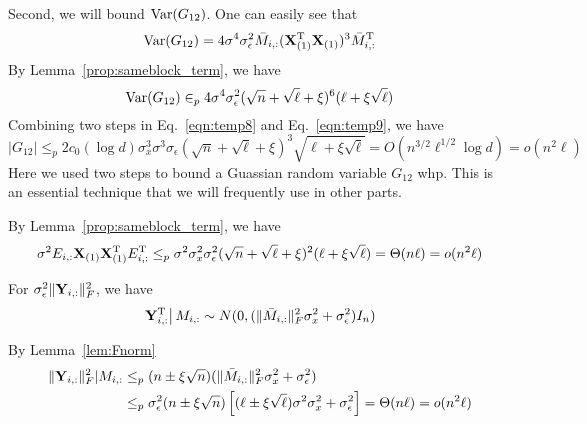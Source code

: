 Second, we will bound $\mathrm{Var}(G_{12})$. One can easily see that
\begin{equation}
    \mathrm{Var}(G_{12}) = 4\sigma^4 \sigma^2_{\epsilon} \bar M_{i, :}(\mathbf{X}_{(1)}^{\mathrm{T}}\mathbf{X}_{(1)})^3\bar M^{\mathrm{T}}_{i, :}
\end{equation}
By Lemma~\ref{prop:sameblock_term}, we have
\begin{equation} \label{eqn:temp9}
    \mathrm{Var}(G_{12}) \in_p 4\sigma^4 \sigma^2_{\epsilon} (\sqrt{n} + \sqrt{\ell} + \xi)^6 (\ell + \xi\sqrt{\ell})
\end{equation}
Combining two steps in Eq.~\ref{eqn:temp8} and Eq.~\ref{eqn:temp9}, we have
\begin{equation}
    |G_{12}| 
    \leq_p 2c_0 (\log d) \sigma^3_x\sigma^3 \sigma_{\epsilon} (\sqrt{n} + \sqrt{\ell} + \xi)^3 \sqrt{\ell + \xi\sqrt{\ell}}
    = O(n^{3/2}\ell^{1/2}\log d)
    = o(n^2 \ell)
\end{equation}
Here we used two steps to bound a Guassian random variable $G_{12}$ whp. This is an essential technique that we will frequently use in other parts.



By Lemma~\ref{prop:sameblock_term}, we have
\begin{equation}
    \sigma^2 E_{i,:}\mathbf{X}_{(1)} \mathbf{X}_{(1)}^{\mathrm{T}} E^{\mathrm{T}}_{i,:} 
    \leq_p 
    \sigma^2 \sigma^2_x \sigma^2_{\epsilon} (\sqrt{n} + \sqrt{\ell} + \xi)^2(\ell + \xi\sqrt{\ell})
    = \Theta(n \ell)
    = o(n^2 \ell)
\end{equation}


For $\sigma^2_{\epsilon}\|\mathbf{Y}_{i,:}\|^2_F$, we have 
\begin{equation}
    \left. \mathbf{Y}^{\mathrm{T}}_{i,:} \right| M_{i,:}  \sim N(0, (\|\bar M_{i,:}\|^2_F\sigma_x^2+\sigma^2_{\epsilon})I_n)
\end{equation}

By Lemma~\ref{lem:Fnorm}
\begin{equation}
\begin{split}
    \|\mathbf{Y}_{i,:}\|^2_F | M_{i,:} 
    &\leq_p (n \pm \xi \sqrt{n})(\|\bar M_{i,:}\|^2_F\sigma_x^2+\sigma^2_{\epsilon})  \\ 
    &\leq_p \sigma^2_{\epsilon}(n \pm \xi \sqrt{n})\left[(\ell \pm \xi \sqrt{\ell})\sigma^2\sigma^2_x + \sigma^2_{\epsilon} \right]   
    = \Theta(n\ell)   
    = o(n^2 \ell)
\end{split}
\end{equation}

